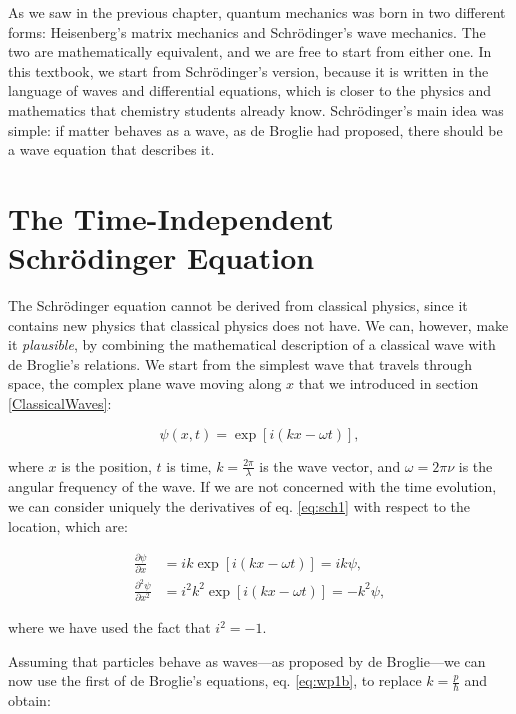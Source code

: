 \documentclass[
  english,
  9pt,
]{extbook}
\theoremstyle{definition}
\theoremstyle{definition}
\theoremstyle{definition}
\theoremstyle{definition}
\theoremstyle{remark}
\begin{document}
As we saw in the previous chapter, quantum mechanics was born in two different forms: Heisenberg's matrix mechanics and Schrödinger's wave mechanics. The two are mathematically equivalent, and we are free to start from either one. In this textbook, we start from Schrödinger's version, because it is written in the language of waves and differential equations, which is closer to the physics and mathematics that chemistry students already know. Schrödinger's main idea was simple: if matter behaves as a wave, as de Broglie had proposed, there should be a wave equation that describes it.

\section{The Time-Independent Schrödinger Equation}\label{the-time-independent-schruxf6dinger-equation}

The Schrödinger equation cannot be derived from classical physics, since it contains new physics that classical physics does not have. We can, however, make it \emph{plausible}, by combining the mathematical description of a classical wave with de Broglie's relations. We start from the simplest wave that travels through space, the complex plane wave moving along \(x\) that we introduced in section \ref{ClassicalWaves}:

\begin{equation}
\psi(x,t)=\exp[i(kx-\omega t)],
\label{eq:sch1}
\end{equation}

where \(x\) is the position, \(t\) is time, \(k=\frac{2\pi}{\lambda}\) is the wave vector, and \(\omega=2\pi\nu\) is the angular frequency of the wave. If we are not concerned with the time evolution, we can consider uniquely the derivatives of eq. \eqref{eq:sch1} with respect to the location, which are:

\begin{equation}
\begin{aligned}
\frac{\partial \psi}{\partial x} &=ik\exp[i(kx-\omega t)] = ik\psi, \\
\frac{\partial^2 \psi}{\partial x^2} &=i^2k^2\exp[i(kx-\omega t)] = -k^2\psi,
\end{aligned}
\label{eq:sch2}
\end{equation}

where we have used the fact that \(i^2=-1\).

Assuming that particles behave as waves---as proposed by de Broglie---we can now use the first of de Broglie's equations, eq. \eqref{eq:wp1b}, to replace \(k=\frac{p}{\hbar}\) and obtain:
\end{document}
